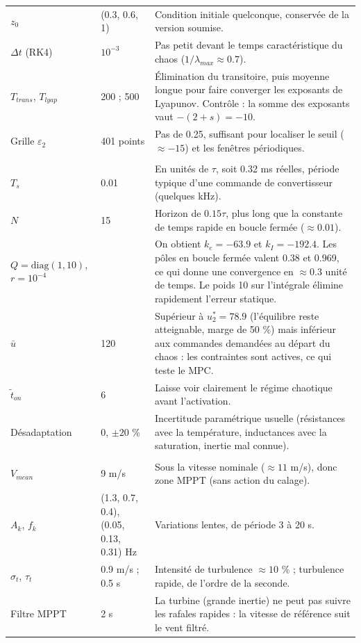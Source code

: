 \documentclass[11pt,a4paper]{article}
\begin{document}
\begin{longtable}{>{\raggedright}p{3.3cm}p{2.3cm}p{9.6cm}}
$z_0$ & (0.3, 0.6, 1) & Condition initiale quelconque, conservée de la version soumise.\\
$\Delta t$ (RK4) & $10^{-3}$ & Pas petit devant le temps caractéristique du chaos ($1/\lambda_{max}\approx0.7$).\\
$T_{trans}$, $T_{lyap}$ & 200 ; 500 & Élimination du transitoire, puis moyenne longue pour faire converger les exposants de Lyapunov. Contrôle : la somme des exposants vaut $-(2+s)=-10$.\\
Grille $\varepsilon_2$ & 401 points & Pas de 0.25, suffisant pour localiser le seuil ($\approx-15$) et les fenêtres périodiques.\\
\midrule
\multicolumn{3}{l}{\textbf{Suppression du chaos (partie 2)}}\\
$T_s$ & 0.01 & En unités de $\tau$, soit 0.32 ms réelles, période typique d'une commande de convertisseur (quelques kHz).\\
$N$ & 15 & Horizon de $0.15\tau$, plus long que la constante de temps rapide en boucle fermée ($\approx0.01$).\\
$Q=\mathrm{diag}(1,10)$, $r=10^{-4}$ & & On obtient $k_e=-63.9$ et $k_I=-192.4$. Les pôles en boucle fermée valent 0.38 et 0.969, ce qui donne une convergence en $\approx0.3$ unité de temps. Le poids 10 sur l'intégrale élimine rapidement l'erreur statique.\\
$\bar u$ & 120 & Supérieur à $u_2^\ast=78.9$ (l'équilibre reste atteignable, marge de 50 \%) mais inférieur aux commandes demandées au départ du chaos : les contraintes sont actives, ce qui teste le MPC.\\
$\tilde t_{on}$ & 6 & Laisse voir clairement le régime chaotique avant l'activation.\\
Désadaptation & 0, $\pm20$ \% & Incertitude paramétrique usuelle (résistances avec la température, inductances avec la saturation, inertie mal connue).\\
\midrule
\multicolumn{3}{l}{\textbf{Vent}}\\
$V_{mean}$ & 9 m/s & Sous la vitesse nominale ($\approx11$ m/s), donc zone MPPT (sans action du calage).\\
$A_k$, $f_k$ & (1.3, 0.7, 0.4), (0.05, 0.13, 0.31) Hz & Variations lentes, de période 3 à 20 s.\\
$\sigma_t$, $\tau_t$ & 0.9 m/s ; 0.5 s & Intensité de turbulence $\approx10$ \% ; turbulence rapide, de l'ordre de la seconde.\\
Filtre MPPT & 2 s & La turbine (grande inertie) ne peut pas suivre les rafales rapides : la vitesse de référence suit le vent filtré.\\

\end{longtable}
\end{document}
